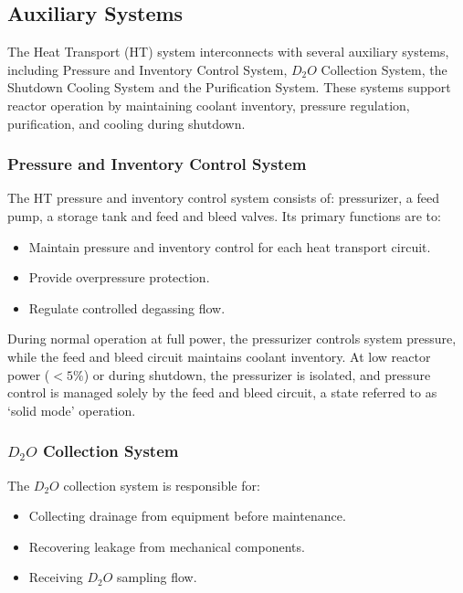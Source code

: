 \documentclass[12pt]{article}
\begin{document}
\begin{multicols}{2}

\subsection{Auxiliary Systems}

The Heat Transport (HT) system interconnects with several auxiliary systems, including Pressure and Inventory Control System, $D_2O$ Collection System, the Shutdown Cooling System and the Purification System. These systems support reactor operation by maintaining coolant inventory, pressure regulation, purification, and cooling during shutdown.

\subsubsection{Pressure and Inventory Control System}

The HT pressure and inventory control system consists of: pressurizer, a feed pump, a storage tank and feed and bleed valves. Its primary functions are to:

\begin{itemize}
    \item Maintain pressure and inventory control for each heat transport circuit.
    \item Provide overpressure protection.
    \item Regulate controlled degassing flow.
\end{itemize}

During normal operation at full power, the pressurizer controls system pressure, while the feed and bleed circuit maintains coolant inventory. At low reactor power ($<5\%$) or during shutdown, the pressurizer is isolated, and pressure control is managed solely by the feed and bleed circuit, a state referred to as ‘solid mode’ operation.

\subsubsection{$D_{2}O$ Collection System}

The $D_{2}O$ collection system is responsible for:
\begin{itemize}
    \item Collecting drainage from equipment before maintenance.
    \item Recovering leakage from mechanical components.
    \item Receiving $D_{2}O$ sampling flow.
\end{itemize}


\end{multicols}
\end{document}
